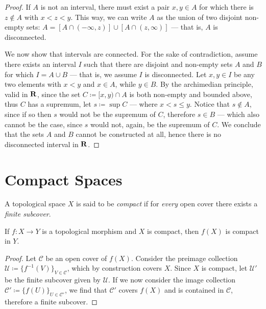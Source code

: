 \begin{proof}
If \(A\) is not an interval, there must exist a pair \(x, y \in A\) for which
there is \(z \notin A\) with \(x < z < y\). This way, we can write \(A\) as the
union of two disjoint non-empty sets: \(A = [A \cap (-\infty, z)] \cup [A \cap
(z, \infty)]\) --- that is, \(A\) is disconnected.

We now show that intervals are connected. For the sake of contradiction, assume
there exists an interval \(I\) such that there are disjoint and non-empty sets
\(A\) and \(B\) for which \(I = A \cup B\) --- that is, we assume \(I\) is
disconnected. Let \(x, y \in I\) be any two elements with \(x < y\) and \(x \in
A\), while \(y \in B\). By the archimedian principle, valid in \(\mathbf{R}\), since the
set \(C \coloneq [x, y) \cap A\) is both non-empty and bounded above, thus \(C\)
has a supremum, let \(s \coloneq \sup C\) --- where \(x < s \leq y\). Notice
that \(s \notin A\), since if so then \(s\) would not be the supremum of \(C\),
therefore \(s \in B\) --- which also cannot be the case, since \(s\) would not,
again, be the supremum of \(C\). We conclude that the sets \(A\) and \(B\)
cannot be constructed at all, hence there is no disconnected interval in \(\mathbf{R}\).
\end{proof}

\section{Compact Spaces}

\begin{definition}
\label{def:compact-space}
A topological space \(X\) is said to be \emph{compact} if for \emph{every} open
cover there exists a \emph{finite subcover}.
\end{definition}

\begin{proposition}
\label{prop:image-of-compact-is-compact}
If \(f: X \to Y\) is a topological morphism and \(X\) is compact, then \(f(X)\)
is compact in \(Y\).
\end{proposition}

\begin{proof}
Let \(\mathcal{C}\) be an open cover of \(f(X)\). Consider the preimage
collection \(\mathcal{U} \coloneq \{f^{-1}(V)\}_{V \in \mathcal{C}}\), which by
construction covers \(X\). Since \(X\) is compact, let \(\mathcal{U}'\) be the
finite subcover given by \(\mathcal{U}\). If we now consider the image
collection \(\mathcal{C}' \coloneq \{f(U)\}_{U \in \mathcal{C}'}\), we find that
\(\mathcal{C}'\) covers \(f(X)\) and is contained in \(\mathcal{C}\), therefore
a finite subcover.
\end{proof}

